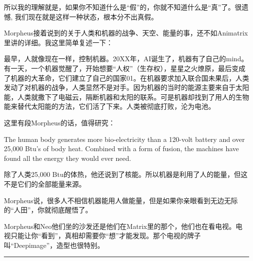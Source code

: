 \documentclass{ctexart}
\newcommand{\myparsep}{\noindent \rule[0.5ex]{\linewidth}{1pt}}
\begin{document}
所以我的理解就是，如果你不知道什么是“假”的，你就不知道什么是“真”了。很遗憾, 我们现在就是这样一种状态，根本分不出真假。

Morpheus接着说到的关于人类和机器的战争、天空、能量的事，还不如Animatrix里讲的详细。我这里简单复述一下：

最早，人就像现在一样，控制机器。20XX年，AI诞生了，机器有了自己的mind。有一天，一个机器觉醒了，开始想要“人权”（生存权），星星之火燎原，最后变成了机器的大革命，它们建立了自己的国家01。在机器要求加入联合国未果后，人类发动了对机器的战争，人类显然不是对手。因为机器的当时的能源主要来自于太阳能，人类就撒下了电磁云，隔断机器和太阳的联系。可是机器却找到了用人的生物能来替代太阳能的方法，它们活了下来。人类被彻底打败，沦为电池。

这里有段Morpheus的话，值得研究：

The human body generates more bio-electricity than a 120-volt battery and over 25,000 Btu's of body heat. Combined with a form of fusion, the machines have found all the energy they would ever need.

除了人类25,000 Btu的体热，他还说到了核能。所以机器是利用了人的能量，但这不是它们的全部能量来源。

Morpheus说，很多人不相信机器能用人做能量，但是如果你亲眼看到无边无际的“人田”，你就彻底醒悟了。

Morpheus和Neo他们坐的沙发还是他们在Matrix里的那个，他们也在看电视。电视只能让你“看到”，真相却需要你“想”才能发现。那个电视的牌子叫“Deepimage”，造型也很特别。

\myparsep
\end{document}
